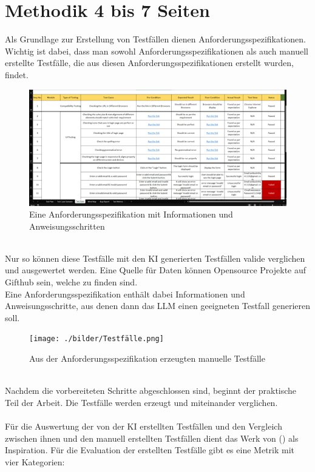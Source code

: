 \documentclass[12pt,toc=bib,toc=listof]{scrreprt}
\begin{document}
\chapter{Methodik 4 bis 7 Seiten} %
\label{sec:methodik}
Als Grundlage zur Erstellung von Testfällen dienen Anforderungsspezifikationen. Wichtig ist dabei, dass man sowohl Anforderungsspezifikationen als auch manuell erstellte Testfälle, die aus diesen Anforderungsspezifikationen erstellt wurden, findet.\\
\begin{figure} [h!]
    \centering
    \includegraphics[width=1\linewidth]{./bilder/Testspezifikationen.png}
    \caption{Eine Anforderungsspezifikation mit Informationen und Anweisungsschritten}
\end{figure}
\\
Nur so können diese Testfälle mit den KI generierten Testfällen valide verglichen und ausgewertet werden. Eine Quelle für Daten können Opensource Projekte auf Gifthub sein, welche zu finden sind.\\
\newpage
\noindent Eine Anforderungsspezifikation enthält dabei Informationen und Anweisungsschritte, aus denen dann das LLM einen geeigneten Testfall generieren soll.\\
\begin{figure} [h!]
    \centering
    \texttt{[image: ./bilder/Testfälle.png]}
    \caption{Aus der Anforderungsspezifikation erzeugten manuelle Testfälle}
\end{figure}
\\
Nachdem die vorbereiteten Schritte abgeschlossen sind, beginnt der praktische Teil der Arbeit. Die Testfälle werden erzeugt und miteinander verglichen.\\
\\
Für die Auswertung der von der KI erstellten Testfällen und den Vergleich zwischen ihnen und den manuell erstellten Testfällen dient das Werk von (\cite{Wang2024}) als Inspiration. Für die Evaluation der erstellten Testfälle gibt es eine Metrik mit vier Kategorien:\\
\end{document}
